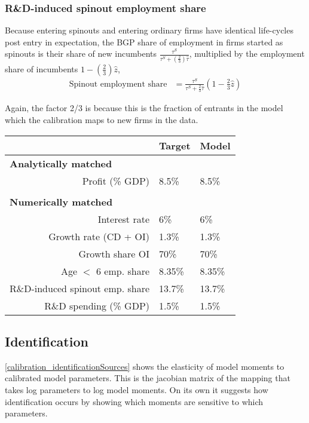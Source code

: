 \documentclass[11pt,english]{article}
\theoremstyle{remark}
\begin{document}
\subsubsection{R\&D-induced spinout employment share}

Because entering spinouts and entering ordinary firms have identical life-cycles post entry in expectation, the BGP share of employment in firms started as spinouts is their share of new incumbents $\frac{\tau^S}{\tau^S+ (\frac{2}{3})\hat{\tau}}$, multiplied by the employment share of incumbents $1- (\frac{2}{3})\hat{z}$, 
\begin{align*}
	\textrm{Spinout employment share} &= \frac{\tau^S}{\tau^S + \frac{2}{3}\hat{\tau}} (1 - \frac{2}{3}\hat{z}) 
\end{align*}

Again, the factor 2/3 is because this is the fraction of entrants in the model which the calibration maps to new firms in the data.


\begin{table}[]
	\centering
	\label{calibration_targets}
	\begin{tabular}{rll}
		\toprule \toprule
		& Target & Model \tabularnewline
		\midrule
		\multicolumn{1}{l}{\textbf{Analytically matched}} & & 
		\tabularnewline
		Profit (\% GDP) & 8.5\% & 8.5\% 
		\tabularnewline
		\tabularnewline
		\multicolumn{1}{l}{\textbf{Numerically matched}} & & 
		\tabularnewline
		Interest rate & 6\% & 6\% 
		\tabularnewline
		Growth rate (CD + OI) & 1.3\% & 1.3\%
		\tabularnewline		
		Growth share OI & 70\% & 70\%
		\tabularnewline
		Age $<$ 6 emp. share  & 8.35\% & 8.35\%
		\tabularnewline
		R\&D-induced spinout emp. share & 13.7\% & 13.7\%
		\tabularnewline
		R\&D spending (\% GDP) & 1.5\% & 1.5\%
		\tabularnewline
		\bottomrule
	\end{tabular}
\end{table}

\normalsize

\subsection{Identification}

\autoref{calibration_identificationSources} shows the elasticity of model moments to calibrated model parameters. This is the jacobian matrix of the mapping that takes log parameters to log model moments. On its own it suggests how identification occurs by showing which moments are sensitive to which parameters. 
\end{document}
